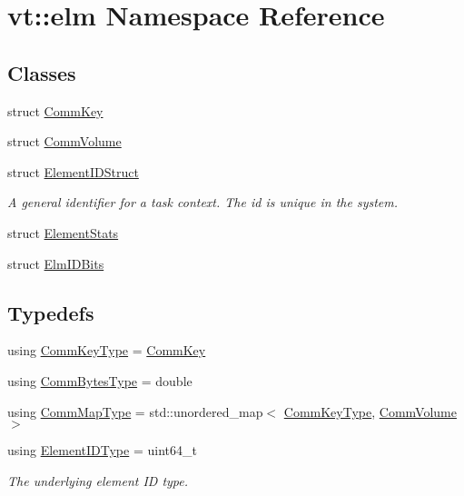 \hypertarget{namespacevt_1_1elm}{}\section{vt\+:\+:elm Namespace Reference}
\label{namespacevt_1_1elm}
\subsection*{Classes}
\begin{DoxyCompactItemize}
\item 
struct \hyperlink{structvt_1_1elm_1_1_comm_key}{Comm\+Key}
\item 
struct \hyperlink{structvt_1_1elm_1_1_comm_volume}{Comm\+Volume}
\item 
struct \hyperlink{structvt_1_1elm_1_1_element_i_d_struct}{Element\+I\+D\+Struct}
\begin{DoxyCompactList}\small\item\em A general identifier for a task context. The {\ttfamily id} is unique in the system. \end{DoxyCompactList}\item 
struct \hyperlink{structvt_1_1elm_1_1_element_stats}{Element\+Stats}
\item 
struct \hyperlink{structvt_1_1elm_1_1_elm_i_d_bits}{Elm\+I\+D\+Bits}
\end{DoxyCompactItemize}
\subsection*{Typedefs}
\begin{DoxyCompactItemize}
\item 
using \hyperlink{namespacevt_1_1elm_a89067ebf8407548591583dd2f60b53b5}{Comm\+Key\+Type} = \hyperlink{structvt_1_1elm_1_1_comm_key}{Comm\+Key}
\item 
using \hyperlink{namespacevt_1_1elm_a6005d029f0531d2809076ce7186416bf}{Comm\+Bytes\+Type} = double
\item 
using \hyperlink{namespacevt_1_1elm_a38487cb8896b9b4763efa9022fab560e}{Comm\+Map\+Type} = std\+::unordered\+\_\+map$<$ \hyperlink{namespacevt_1_1elm_a89067ebf8407548591583dd2f60b53b5}{Comm\+Key\+Type}, \hyperlink{structvt_1_1elm_1_1_comm_volume}{Comm\+Volume} $>$
\item 
using \hyperlink{namespacevt_1_1elm_a63afb64985b41b7b6dcf2f01336391f8}{Element\+I\+D\+Type} = uint64\+\_\+t
\begin{DoxyCompactList}\small\item\em The underlying element ID type. \end{DoxyCompactList}\end{DoxyCompactItemize}
